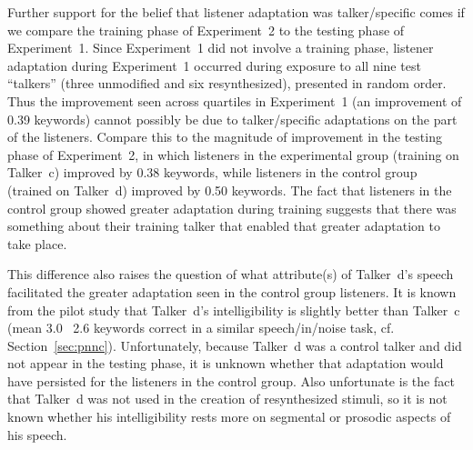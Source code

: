 Further support for the belief that listener adaptation was talker\-/specific comes if we compare the training phase of Experiment~2 to the testing phase of Experiment~1.  Since Experiment~1 did not involve a training phase, listener adaptation during Experiment~1 occurred during exposure to all nine test “talkers” (three unmodified and six resynthesized), presented in random order.  Thus the improvement seen across quartiles in Experiment~1 (an improvement of 0.39 keywords) cannot possibly be due to talker\-/specific adaptations on the part of the listeners.  Compare this to the magnitude of improvement in the testing phase of Experiment~2, in which listeners in the experimental group (training on Talker~\ac{c}) improved by 0.38 keywords, while listeners in the control group (trained on Talker~\ac{d}) improved by 0.50 keywords.  The fact that listeners in the control group showed greater adaptation during training suggests that there was something about their training talker that enabled that greater adaptation to take place.  

This difference also raises the question of what attribute(s) of Talker~\ac{d}’s speech facilitated the greater adaptation seen in the control group listeners.  It is known from the pilot study that Talker~\ac{d}’s intelligibility is slightly better than Talker~\ac{c} (mean 3.0 \vs\ 2.6 keywords correct in a similar speech\-/in\-/noise task, cf. Section~\ref{sec:pnnc}).  Unfortunately, because Talker~\ac{d} was a control talker and did not appear in the testing phase, it is unknown whether that adaptation would have persisted for the listeners in the control group.  Also unfortunate is the fact that Talker~\ac{d} was not used in the creation of resynthesized stimuli, so it is not known whether his intelligibility rests more on segmental or prosodic aspects of his speech.


